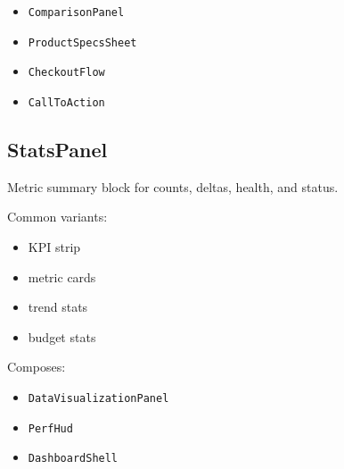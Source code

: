 \begin{itemize}
\tightlist
\item
  \texttt{C\allowbreak{}o\allowbreak{}m\allowbreak{}p\allowbreak{}a\allowbreak{}r\allowbreak{}i\allowbreak{}s\allowbreak{}o\allowbreak{}n\allowbreak{}P\allowbreak{}a\allowbreak{}n\allowbreak{}e\allowbreak{}l}
\item
  \texttt{P\allowbreak{}r\allowbreak{}o\allowbreak{}d\allowbreak{}u\allowbreak{}c\allowbreak{}t\allowbreak{}S\allowbreak{}p\allowbreak{}e\allowbreak{}c\allowbreak{}s\allowbreak{}S\allowbreak{}h\allowbreak{}e\allowbreak{}e\allowbreak{}t}
\item
  \texttt{C\allowbreak{}h\allowbreak{}e\allowbreak{}c\allowbreak{}k\allowbreak{}o\allowbreak{}u\allowbreak{}t\allowbreak{}F\allowbreak{}l\allowbreak{}o\allowbreak{}w}
\item
  \texttt{C\allowbreak{}a\allowbreak{}l\allowbreak{}l\allowbreak{}T\allowbreak{}o\allowbreak{}A\allowbreak{}c\allowbreak{}t\allowbreak{}i\allowbreak{}o\allowbreak{}n}
\end{itemize}

\subsection{StatsPanel}\label{record-128-statspanel}

Metric summary block for counts, deltas, health, and status.

Common variants:

\begin{itemize}
\tightlist
\item
  KPI strip
\item
  metric cards
\item
  trend stats
\item
  budget stats
\end{itemize}

Composes:

\begin{itemize}
\tightlist
\item
  \texttt{D\allowbreak{}a\allowbreak{}t\allowbreak{}a\allowbreak{}V\allowbreak{}i\allowbreak{}s\allowbreak{}u\allowbreak{}a\allowbreak{}l\allowbreak{}i\allowbreak{}z\allowbreak{}a\allowbreak{}t\allowbreak{}i\allowbreak{}o\allowbreak{}n\allowbreak{}P\allowbreak{}a\allowbreak{}n\allowbreak{}e\allowbreak{}l}
\item
  \texttt{P\allowbreak{}e\allowbreak{}r\allowbreak{}f\allowbreak{}H\allowbreak{}u\allowbreak{}d}
\item
  \texttt{D\allowbreak{}a\allowbreak{}s\allowbreak{}h\allowbreak{}b\allowbreak{}o\allowbreak{}a\allowbreak{}r\allowbreak{}d\allowbreak{}S\allowbreak{}h\allowbreak{}e\allowbreak{}l\allowbreak{}l}
\end{itemize}

